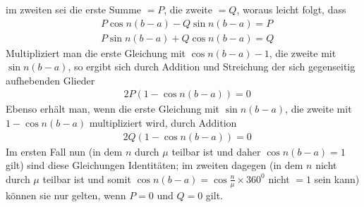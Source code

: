 im zweiten sei die erste Summe \(=P\), die zweite \(=Q\), woraus leicht folgt, dass
\[
\begin{aligned}
&P\cos n(b-a)-Q\sin n(b-a)=P\\[5pt]
&P\sin n(b-a)+Q\cos n(b-a)=Q
\end{aligned}
\]
Multipliziert man die erste Gleichung mit \(\cos n(b-a)-1\), die zweite mit \(\sin n(b-a)\),
so ergibt sich durch Addition und Streichung der sich gegenseitig aufhebenden Glieder
\[
\begin{aligned}
&2P(1-\cos n(b-a))=0
\end{aligned}
\]
Ebenso erhält man, wenn die erste Gleichung mit \(\sin n(b-a)\), die zweite mit
\(1-\cos n(b-a)\) multipliziert wird, durch Addition
\[
\begin{aligned}
&2Q(1-\cos n(b-a))=0
\end{aligned}
\]
Im ersten Fall nun (in dem \(n\) durch \(\mu\) teilbar ist und daher \(\cos n(b-a)=1\) gilt)
sind diese Gleichungen Identitäten; im zweiten dagegen (in dem \(n\) nicht durch \(\mu\) teilbar ist und somit \(\cos n(b-a)=\cos\frac{n}{\mu}\times360^{0}\) nicht \(=1\) sein kann) können sie nur gelten, wenn \(P=0\) und \(Q=0\) gilt.

